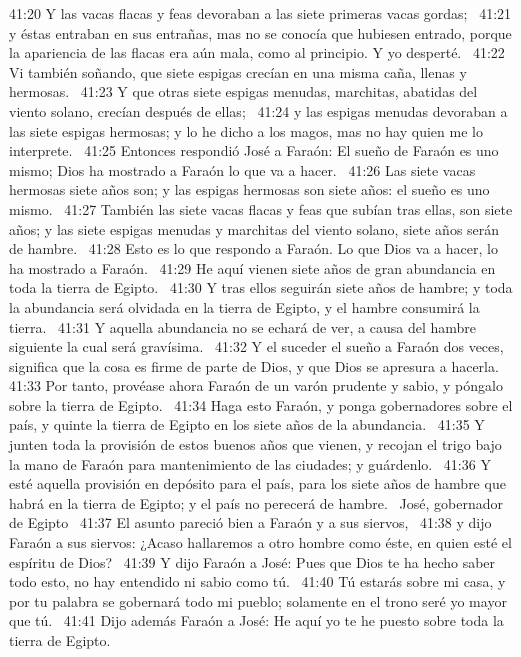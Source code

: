 41:20 Y las vacas flacas y feas devoraban a las siete primeras vacas gordas;  
41:21 y éstas entraban en sus entrañas, mas no se conocía que hubiesen entrado, porque la apariencia de las flacas era aún mala, como al principio. Y yo desperté.  
41:22 Vi también soñando, que siete espigas crecían en una misma caña, llenas y hermosas.  
41:23 Y que otras siete espigas menudas, marchitas, abatidas del viento solano, crecían después de ellas;  
41:24 y las espigas menudas devoraban a las siete espigas hermosas; y lo he dicho a los magos, mas no hay quien me lo interprete.  
41:25 Entonces respondió José a Faraón: El sueño de Faraón es uno mismo; Dios ha mostrado a Faraón lo que va a hacer.  
41:26 Las siete vacas hermosas siete años son; y las espigas hermosas son siete años: el sueño es uno mismo.  
41:27 También las siete vacas flacas y feas que subían tras ellas, son siete años; y las siete espigas menudas y marchitas del viento solano, siete años serán de hambre.  
41:28 Esto es lo que respondo a Faraón. Lo que Dios va a hacer, lo ha mostrado a Faraón.  
41:29 He aquí vienen siete años de gran abundancia en toda la tierra de Egipto.  
41:30 Y tras ellos seguirán siete años de hambre; y toda la abundancia será olvidada en la tierra de Egipto, y el hambre consumirá la tierra.  
41:31 Y aquella abundancia no se echará de ver, a causa del hambre siguiente la cual será gravísima.  
41:32 Y el suceder el sueño a Faraón dos veces, significa que la cosa es firme de parte de Dios, y que Dios se apresura a hacerla.  
41:33 Por tanto, provéase ahora Faraón de un varón prudente y sabio, y póngalo sobre la tierra de Egipto.  
41:34 Haga esto Faraón, y ponga gobernadores sobre el país, y quinte la tierra de Egipto en los siete años de la abundancia.  
41:35 Y junten toda la provisión de estos buenos años que vienen, y recojan el trigo bajo la mano de Faraón para mantenimiento de las ciudades; y guárdenlo.  
41:36 Y esté aquella provisión en depósito para el país, para los siete años de hambre que habrá en la tierra de Egipto; y el país no perecerá de hambre.  
José, gobernador de Egipto  
41:37 El asunto pareció bien a Faraón y a sus siervos,  
41:38 y dijo Faraón a sus siervos: ¿Acaso hallaremos a otro hombre como éste, en quien esté el espíritu de Dios?  
41:39 Y dijo Faraón a José: Pues que Dios te ha hecho saber todo esto, no hay entendido ni sabio como tú.  
41:40 Tú estarás sobre mi casa, y por tu palabra se gobernará todo mi pueblo; solamente en el trono seré yo mayor que tú.  
41:41 Dijo además Faraón a José: He aquí yo te he puesto sobre toda la tierra de Egipto.  
